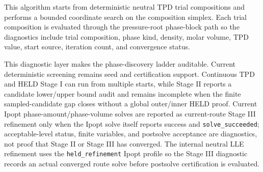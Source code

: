 \documentclass[12pt, letterpaper]{article}
\begin{document}
This algorithm starts from deterministic neutral TPD trial compositions and
performs a bounded coordinate search on the composition simplex. Each trial
composition is evaluated through the pressure-root phase-block path so the
diagnostics include trial composition, phase kind, density, molar volume,
TPD value, start source, iteration count, and convergence status.


This diagnostic layer makes the phase-discovery ladder auditable. Current
deterministic screening remains seed and certification support. Continuous TPD
and HELD Stage I can run from multiple starts, while Stage II reports a
candidate lower/upper bound audit and remains incomplete when the finite
sampled-candidate gap closes without a global outer/inner HELD proof. Current
Ipopt phase-amount/phase-volume solves are reported as
current-route Stage III refinement only when the Ipopt solve itself reports
success and \texttt{solve\_succeeded}; acceptable-level status, finite variables, and
postsolve acceptance are diagnostics, not proof that Stage II or Stage III has
converged.
The internal neutral LLE refinement uses the \texttt{held\_refinement} Ipopt profile so the
Stage III diagnostic records an actual converged route solve before postsolve
certification is evaluated.
\end{document}
